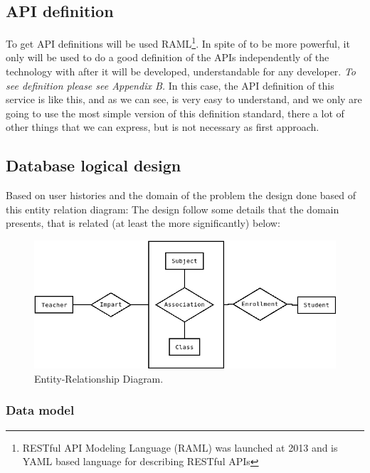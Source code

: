 \subsection{API definition}

To get API definitions will be used  RAML\footnote{ RESTful API Modeling Language
(RAML) was launched at 2013 and is YAML based language for describing RESTful APIs }.
In spite of to be more powerful, it only will be used to do a good definition of the
APIs independently of the technology with after it will be developed, understandable
for any developer.
\intro
\textit{To see definition please see Appendix B.}
\intro
In this case, the API definition of this service is like this, and as we can see,
is very easy to understand, and we only are going to use the most simple
version of this definition standard, there a lot of other things that we can
express, but is not necessary as first approach.





\subsection{Database logical design}

Based on user histories and the domain of the problem the design
done based of this entity relation diagram:
\intro
The design follow some details that the domain presents, that is related
(at least the more significantly) below:

\begin{figure}[H]
  \includegraphics[scale=0.4]{img/diagrams/dbms-ER.png}
  \centering
  \caption{Entity-Relationship Diagram.}
\end{figure}


\subsubsection{Data model}

